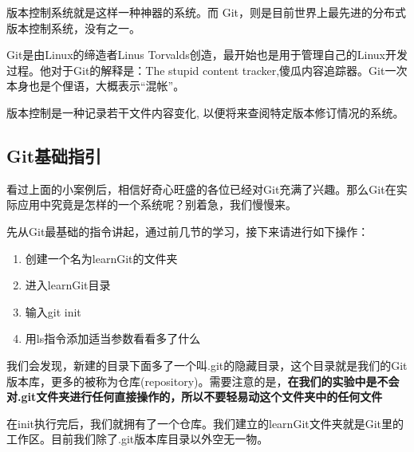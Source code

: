 版本控制系统就是这样一种神器的系统。而 Git，则是目前世界上最先进的分布式版本控制系统，没有之一。

Git是由Linux的缔造者Linus Torvalds创造，最开始也是用于管理自己的Linux开发过程。他对于Git的解释是：The stupid content tracker,傻瓜内容追踪器。Git一次本身也是个俚语，大概表示“混帐”。

\begin{note}
版本控制是一种记录若干文件内容变化, 以便将来查阅特定版本修订情况的系统。
\end{note}

\subsection{Git基础指引}
看过上面的小案例后，相信好奇心旺盛的各位已经对Git充满了兴趣。那么Git在实际应用中究竟是怎样的一个系统呢？别着急，我们慢慢来。

先从Git最基础的指令讲起，通过前几节的学习，接下来请进行如下操作：
\begin{enumerate}
    \item 创建一个名为learnGit的文件夹
    \item 进入learnGit目录
	\item 输入git init
	\item 用ls指令添加适当参数看看多了什么
\end{enumerate}
我们会发现，新建的目录下面多了一个叫.git的隐藏目录，这个目录就是我们的Git版本库，更多的被称为仓库(repository)。需要注意的是，\textbf{在我们的实验中是不会对.git文件夹进行任何直接操作的，所以不要轻易动这个文件夹中的任何文件}

在init执行完后，我们就拥有了一个仓库。我们建立的learnGit文件夹就是Git里的工作区。目前我们除了.git版本库目录以外空无一物。

